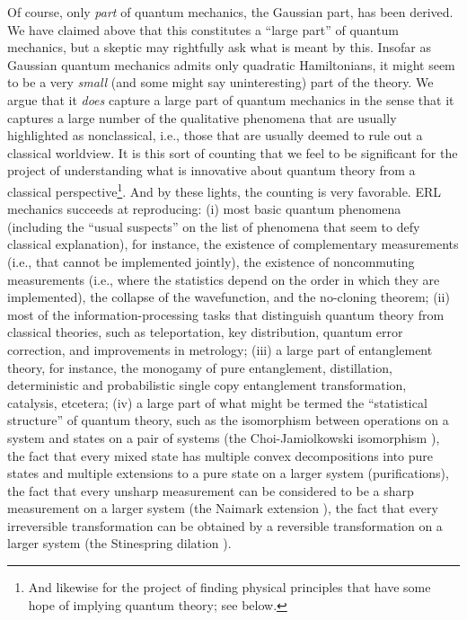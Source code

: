 \documentclass[pra,superscriptaddress,nofootinbib,12pt]{revtex4-2}
\begin{document}
Of course, only \emph{part} of quantum mechanics, the Gaussian part, has been derived.   We have claimed above that this constitutes a ``large part'' of quantum mechanics, but a
skeptic may rightfully ask what is meant by this.  Insofar as Gaussian
quantum mechanics admits only quadratic Hamiltonians, it might seem to be a
very \emph{small} (and some might say uninteresting) part of the theory.
We argue that it \emph{does} capture a large part of quantum mechanics in
the sense that it captures a large number of the qualitative phenomena that
are usually highlighted as nonclassical, i.e., those that are usually deemed
to rule out a classical worldview.  It is this sort of counting that we
feel to be significant for the project of understanding what is innovative
about quantum theory from a classical perspective\footnote{And likewise for the project of finding physical principles that have some hope of implying quantum theory; see below.}. And by these lights, the counting is very favorable. ERL mechanics
succeeds at reproducing: (i) most basic quantum phenomena (including the
``usual suspects'' on the list of phenomena
that seem to defy classical explanation), for instance, the existence of
complementary measurements (i.e., that cannot be implemented jointly), the
existence of noncommuting measurements (i.e., where the statistics depend on
the order in which they are implemented), the collapse of the wavefunction,
and the no-cloning theorem; (ii) most of the information-processing tasks
that distinguish quantum theory from classical theories, such as
teleportation, key distribution, quantum error correction, and improvements
in metrology; (iii) a large part of entanglement theory, for instance, the
monogamy of pure entanglement, distillation, deterministic and probabilistic
single copy entanglement transformation, catalysis, etcetera; (iv) a large
part of what might be termed the ``statistical
structure'' of quantum theory, such as the isomorphism
between operations on a system and states on a pair of systems (the
Choi-Jamiolkowski isomorphism \cite{BZbook}), the fact that every mixed state has multiple
convex decompositions into pure states and multiple extensions to a pure
state on a larger system (purifications), the fact that every unsharp
measurement can be considered to be a sharp measurement on a larger system
(the Naimark extension \cite{BZbook}), the fact that every irreversible transformation can
be obtained by a reversible transformation on a larger system (the
Stinespring dilation \cite{BZbook}).
\end{document}
